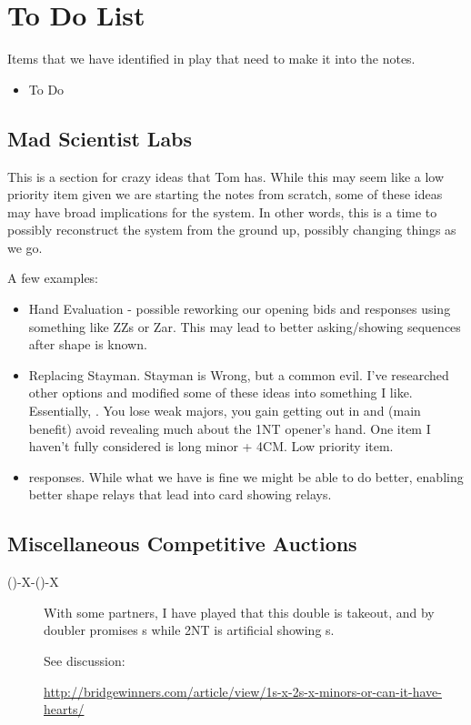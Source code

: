 \documentclass[tom-ari]{subfile}
\begin{document}
	
	\chapter{To Do List}
	
	Items that we have identified in play that need to make it into the notes.
	\begin{itemize}
		\item To Do
	\end{itemize}

	\section{Mad Scientist Labs}
	
	This is a section for crazy ideas that Tom has.  While this may seem like a low priority item given we are starting the notes from scratch, some of these ideas may have broad implications for the system.  In other words, this is a time to possibly reconstruct the system from the ground up, possibly changing things as we go.
	
	A few examples:
	
	\begin{itemize}
		\item Hand Evaluation - possible reworking our opening bids and responses using something like ZZs or Zar.  This may lead to better asking/showing sequences after shape is known.
		\item Replacing Stayman.  Stayman is Wrong, but a common evil.  I've researched other options and modified some of these ideas into something I like.  Essentially, \rightarrow{}.  You lose weak majors, you gain getting out in  and (main benefit) avoid revealing much about the 1NT opener's hand.  One item I haven't fully considered is long minor + 4CM.  Low priority item.
		\item {} responses.  While what we have is fine we might be able to do better, enabling better shape relays that lead into card showing relays.
	\end{itemize}

     \section{Miscellaneous Competitive Auctions}
     \begin{description}
         \item[()-X-()-X] With some partners, I have played that this double is takeout, and  by doubler promises s while 2NT is artificial showing s. 
         
         See discussion: 
         
         \url{http://bridgewinners.com/article/view/1s-x-2s-x-minors-or-can-it-have-hearts/}
          
     \end{description}
	
\end{document}
